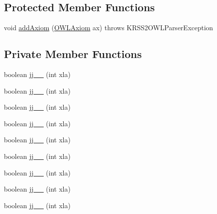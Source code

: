 \subsection*{Protected Member Functions}
\begin{DoxyCompactItemize}
\item 
void \hyperlink{classde_1_1uulm_1_1ecs_1_1ai_1_1owlapi_1_1krssparser_1_1_k_r_s_s2_parser_a06608a5fe818044839cb714c188946d9}{add\-Axiom} (\hyperlink{interfaceorg_1_1semanticweb_1_1owlapi_1_1model_1_1_o_w_l_axiom}{O\-W\-L\-Axiom} ax)  throws K\-R\-S\-S2\-O\-W\-L\-Parser\-Exception 
\end{DoxyCompactItemize}
\subsection*{Private Member Functions}
\begin{DoxyCompactItemize}
\item 
boolean \hyperlink{classde_1_1uulm_1_1ecs_1_1ai_1_1owlapi_1_1krssparser_1_1_k_r_s_s2_parser_ae03d027829450468d92dcb562fc6b5a1}{jj\-\_\-\_} (int xla)
\item 
boolean \hyperlink{classde_1_1uulm_1_1ecs_1_1ai_1_1owlapi_1_1krssparser_1_1_k_r_s_s2_parser_abcb688022f5afe1969fde8add76cdcbd}{jj\-\_\-\_} (int xla)
\item 
boolean \hyperlink{classde_1_1uulm_1_1ecs_1_1ai_1_1owlapi_1_1krssparser_1_1_k_r_s_s2_parser_af9c3f640b699a1b9981f48f6438f192c}{jj\-\_\-\_} (int xla)
\item 
boolean \hyperlink{classde_1_1uulm_1_1ecs_1_1ai_1_1owlapi_1_1krssparser_1_1_k_r_s_s2_parser_aea673a98c9035cc3f739a122623e0e61}{jj\-\_\-\_} (int xla)
\item 
boolean \hyperlink{classde_1_1uulm_1_1ecs_1_1ai_1_1owlapi_1_1krssparser_1_1_k_r_s_s2_parser_a5198fc51bb2cbbf1ecd9f7c0d52fe2d2}{jj\-\_\-\_} (int xla)
\item 
boolean \hyperlink{classde_1_1uulm_1_1ecs_1_1ai_1_1owlapi_1_1krssparser_1_1_k_r_s_s2_parser_a1d117da0dc1ef31e762d326f1bfba317}{jj\-\_\-\_} (int xla)
\item 
boolean \hyperlink{classde_1_1uulm_1_1ecs_1_1ai_1_1owlapi_1_1krssparser_1_1_k_r_s_s2_parser_a5bd6a1c6baf973a39251f89dee1a4fb6}{jj\-\_\-\_} (int xla)
\item 
boolean \hyperlink{classde_1_1uulm_1_1ecs_1_1ai_1_1owlapi_1_1krssparser_1_1_k_r_s_s2_parser_aefada4d612ac23903bdedde9206c2a55}{jj\-\_\-\_} (int xla)
\item 
boolean \hyperlink{classde_1_1uulm_1_1ecs_1_1ai_1_1owlapi_1_1krssparser_1_1_k_r_s_s2_parser_af517d5178a9486cd4bf4aa40df6b8135}{jj\-\_\-\_} (int xla)

\end{DoxyCompactItemize}
